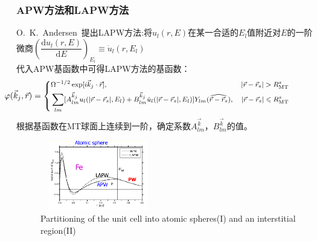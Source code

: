 \frame
{
\frametitle{\textrm{APW}方法和\textrm{LAPW}方法}
\textrm{O.~K.~Andersen~}提出\textrm{LAPW}方法:将$u_l(r,E)$在某一合适的$E_l$值附近对$E$的一阶微商{\footnotesize$\left(\dfrac{\textrm{d}u_l(r,E)}{\textrm{d}E}\right)_{E_l}\equiv\dot u_l(r,E_l)$}\\代入\textrm{APW}基函数中可得\textrm{LAPW}方法的基函数：
$${\footnotesize\hskip -50pt \varphi(\vec k_j,\vec r)=\left\{
  \begin{aligned}
    &\Omega^{-1/2}\exp[i\vec k_j\cdot\vec r],&|\vec r-\vec r_s|>R_{\mathrm{MT}}^s\\
    &\sum_{lm}[A^{\vec k_j}_{lm}u_l(|\vec r-\vec r_s|,E_l)+B^{\vec k_j}_{lm}\dot u_l(|\vec r-\vec r_s|,E_l)]Y_{lm}(\widehat{\vec r-\vec r_s}),&|\vec r-\vec r_s|\leqslant R_{\mathrm{MT}}^s
  \end{aligned}
\right.}$$
根据基函数在\textrm{MT}球面上连续到一阶，确定系数$A^{\vec k}_{lm}$，$B^{\vec k}_{lm}$的值。
\begin{figure}[h!]
\centering
\includegraphics[height=1.20in,width=1.98in,viewport=1 20 585 435,clip]{Figures/WIEN2k-LAPW.png}
\caption{\small \textrm{Partitioning of the unit cell into atomic spheres(I) and an interstitial region(II)}}%
\label{Muffin_tin}
\end{figure}
}
\frame
